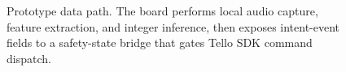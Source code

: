 \begin{figure}[t]
    \centering
    \begingroup
    \setlength{\fboxsep}{3pt}
    \setlength{\tabcolsep}{2pt}
    \endgroup
    \caption{Prototype data path. The board performs local audio capture, feature extraction, and integer inference, then exposes intent-event fields to a safety-state bridge that gates Tello SDK command dispatch.}
    \label{fig:prototype_pipeline}
\end{figure}
